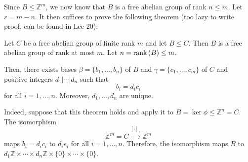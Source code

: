 \documentclass{article}
\begin{document}
Since $B \le \mathbb{Z}^m$, we now know that $B$ is a free abelian group of rank $n \le m$. Let $r=m-n$. It then suffices to prove the following theorem (too lazy to write proof, can be found in Lec 20):
\begin{idea}
    Let $C$ be a free abelian group of finite rank $m$ and let $B \le C$. Then $B$ is a free abelian group of rank at most $m$. Let $n=\mathrm{rank}\,(B) \le m$.
    \vspace{2mm}

    Then, there exists bases $\beta =\{b_1,\dots,b_n\}$ of $B$ and $\gamma=\{c_1,\dots,c_m\}$ of $C$ and positive integers $d_1|\cdots | d_n$ such that
    \begin{equation*}
        b_i = d_i c_i
    \end{equation*}
    for all $i=1,\dots, n$. Moreover, $d_1,\dots,d_n$ are unique.
\end{idea}
Indeed, suppose that this theorem holds and apply it to $B=\ker\phi \le \mathbb{Z}^n = C$. The isomorphism
\begin{equation*}
    \mathbb{Z}^m = C \xrightarrow{[\cdot]_\gamma} \mathbb{Z}^m
\end{equation*}
maps $b_i = d_ic_i$ to $d_ie_i$ for all $i=1,\dots, n$. Therefore, the isomorphism maps $B$ to $d_1\mathbb{Z} \times \cdots \times d_n\mathbb{Z}\times \{0\} \times \cdots \times \{0\}$.
\end{document}
